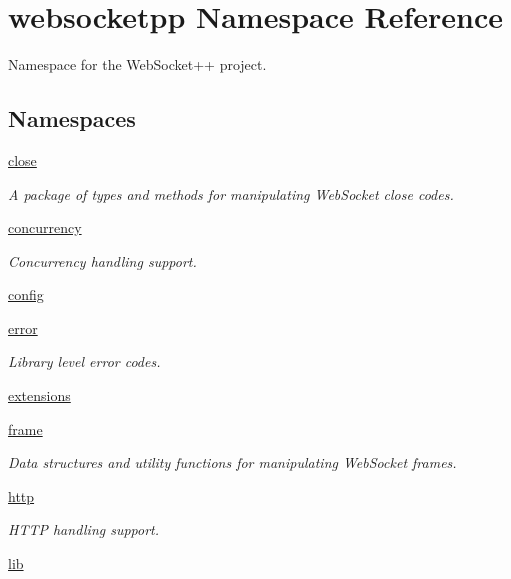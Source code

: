 \hypertarget{namespacewebsocketpp}{}\section{websocketpp Namespace Reference}
\label{namespacewebsocketpp}


Namespace for the Web\+Socket++ project.  


\subsection*{Namespaces}
\begin{DoxyCompactItemize}
\item 
 \hyperlink{namespacewebsocketpp_1_1close}{close}
\begin{DoxyCompactList}\small\item\em A package of types and methods for manipulating Web\+Socket close codes. \end{DoxyCompactList}\item 
 \hyperlink{namespacewebsocketpp_1_1concurrency}{concurrency}
\begin{DoxyCompactList}\small\item\em Concurrency handling support. \end{DoxyCompactList}\item 
 \hyperlink{namespacewebsocketpp_1_1config}{config}
\item 
 \hyperlink{namespacewebsocketpp_1_1error}{error}
\begin{DoxyCompactList}\small\item\em Library level error codes. \end{DoxyCompactList}\item 
 \hyperlink{namespacewebsocketpp_1_1extensions}{extensions}
\item 
 \hyperlink{namespacewebsocketpp_1_1frame}{frame}
\begin{DoxyCompactList}\small\item\em Data structures and utility functions for manipulating Web\+Socket frames. \end{DoxyCompactList}\item 
 \hyperlink{namespacewebsocketpp_1_1http}{http}
\begin{DoxyCompactList}\small\item\em H\+T\+T\+P handling support. \end{DoxyCompactList}\item 
 \hyperlink{namespacewebsocketpp_1_1lib}{lib}

\end{DoxyCompactItemize}
